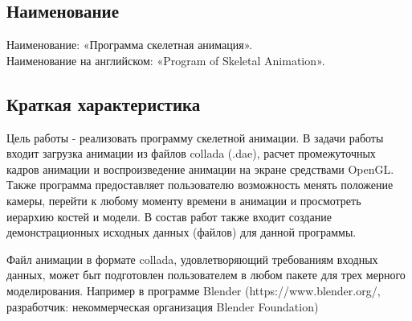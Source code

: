 \subsection{Наименование}
Наименование: «Программа скелетная анимация». \\
Наименование на английском: «Program of Skeletal Animation». \\


\subsection{Краткая характеристика}
    Цель работы - реализовать программу скелетной анимации.
    В задачи работы входит загрузка анимации из файлов collada (.dae), расчет промежуточных кадров анимации и воспроизведение анимации на экране средствами OpenGL.
    Также программа предоставляет пользователю возможность менять положение камеры, перейти к любому моменту времени в анимации и просмотреть иерархию костей и модели.
В состав работ также входит создание демонстрационных исходных данных (файлов) для данной программы.

\smallskip
Файл анимации в формате collada, удовлетворяющий требованиям входных данных, может быт подготовлен пользователем в любом пакете для трех мерного моделирования. Например в программе Blender (https://www.blender.org/, разработчик: некоммерческая организация Blender Foundation)
